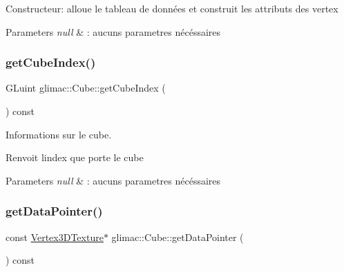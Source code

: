 Constructeur\+: alloue le tableau de données et construit les attributs des vertex


\begin{DoxyParams}{Parameters}
{\em null} & \+: aucuns parametres nécéssaires \\
\hline
\end{DoxyParams}
\mbox{\label{classglimac_1_1Cube_a743bc4c8de7cb3422dc1ba3edc769771}} 
\subsubsection{\texorpdfstring{get\+Cube\+Index()}{getCubeIndex()}}
{\footnotesize\ttfamily G\+Luint glimac\+::\+Cube\+::get\+Cube\+Index (\begin{DoxyParamCaption}{ }\end{DoxyParamCaption}) const\hspace{0.3cm}{\ttfamily [inline]}}



Informations sur le cube. 

Renvoit l\textquotesingle{}index que porte le cube


\begin{DoxyParams}{Parameters}
{\em null} & \+: aucuns parametres nécéssaires \\
\hline
\end{DoxyParams}
\mbox{\label{classglimac_1_1Cube_a29357c655008183dacf647cb3c6fcb12}} 
\subsubsection{\texorpdfstring{get\+Data\+Pointer()}{getDataPointer()}}
{\footnotesize\ttfamily const \hyperlink{structglimac_1_1Vertex3DTexture}{Vertex3\+D\+Texture}$\ast$ glimac\+::\+Cube\+::get\+Data\+Pointer (\begin{DoxyParamCaption}{ }\end{DoxyParamCaption}) const\hspace{0.3cm}{\ttfamily [inline]}}




